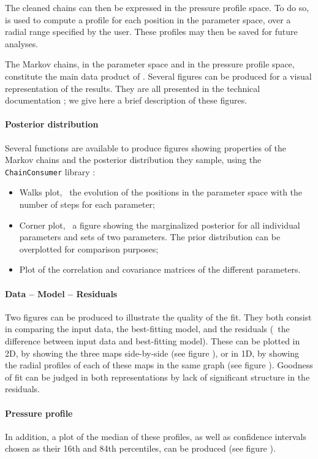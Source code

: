The cleaned chains can then be expressed in the pressure profile space.
To do so,  is used to compute a profile for each position in the parameter space, over a radial range specified by the user.
These profiles may then be saved for future analyses.

The Markov chains, in the parameter space and in the pressure profile space, constitute the main data product of \panco.
Several figures can be produced for a visual representation of the results.
They are all presented in the technical documentation ; we give here a brief description of these figures.

\paragraph{Posterior distribution}
Several functions are available to produce figures showing properties of the Markov chains and the posterior distribution they sample, using the \texttt{ChainConsumer} library \citep{hinton_chainconsumer_2016}:
\begin{itemize}[leftmargin=*]
    \item Walks plot, \ie\ the evolution of the positions in the parameter space with the number of steps for each parameter;
    \item Corner plot, \ie\ a figure showing the marginalized posterior for all individual parameters and sets of two parameters.
        The prior distribution can be overplotted for comparison purposes;
    \item Plot of the correlation and covariance matrices of the different parameters.
\end{itemize}

\paragraph{Data -- Model -- Residuals}
Two figures can be produced to illustrate the quality of the fit.
They both consist in comparing the input data, the best-fitting model, and the residuals (\ie\ the difference between input data and best-fitting model).
These can be plotted in 2D, by showing the three maps side-by-side (see figure \todo{}), or in 1D, by showing the radial profiles of each of these maps in the same graph (see figure \todo{}).
Goodness of fit can be judged in both representations by lack of significant structure in the residuals.

\paragraph{Pressure profile}
In addition, a plot of the median of these profiles, as well as confidence intervals chosen as their 16th and 84th percentiles, can be produced (see figure \todo{}).
